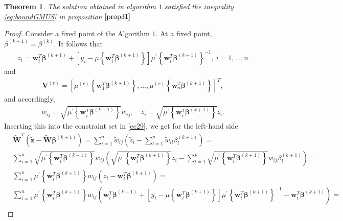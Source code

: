 \documentclass[a4paper,12pt,openany]{report}
\newtheorem{theorem}{\textbf{Theorem}}[section]
\theoremstyle{plain}
\theoremstyle{plain}
\theoremstyle{plain}
\theoremstyle{plain}
\theoremstyle{plain}
\theoremstyle{plain}
\theoremstyle{plain}
\theoremstyle{plain}
\theoremstyle{plain}
\theoremstyle{plain}
\theoremstyle{plain}
\theoremstyle{plain}
\begin{document}
\begin{theorem}
The solution obtained in algorithm $1$ satisfied the inequality \eqref{eq:boundGMUS} in proposition $\ref{prop31}$
\end{theorem}
\begin{proof}
	Consider a fixed point of the Algorithm $1$. At a fixed point, $\beta^{\left(k+1\right)} = \beta^{\left(k\right)}$. It follows that
	\begin{align*}
	z_{i} = \mathbf{w}_{i}^{T}\boldsymbol{\beta}^{(k+1)} + \left[y_{i} - \mu\left\{ \mathbf{w}_{i}^{T}\boldsymbol{\beta}^{(k+1)}\right\}\right]\mu^{\prime}\left\{ \mathbf{w}_{i}^{T}\boldsymbol{\beta}^{(k+1)} \right\}^{-1}, ~i=1,\dots,n
	\end{align*}
	and
	\begin{align*}
	\mathbf{V}^{(r)} = \left[\mu^{(r)}\left\{ \mathbf{w}_{1}^{T}\boldsymbol{\beta}^{(k+1)} \right\} , \dots, \mu^{(r)}\left\{\mathbf{w}_{n}^{T}\boldsymbol{\beta}^{(k+1)} \right\}\right]^{T},
	\end{align*}
	and accordingly,
	\begin{align*}
	\tilde{w}_{ij} = \sqrt{\mu^{\prime}\left\{ \mathbf{w}_{i}^{T}\boldsymbol{\beta}^{(k+1)} \right\} }w_{ij}, \quad \tilde{z}_{i} =\sqrt{\mu^{\prime}\left\{ \mathbf{w}_{i}^{T}\boldsymbol{\beta}^{(k+1)} \right\}}z_{i}.
	\end{align*}
	Inserting this into the constraint set in \eqref{ec29}, we get for the left-hand side
	\begin{align*}
	&\tilde{\mathbf{W}}^{T}\left(\tilde{\mathbf{z}} - \tilde{\mathbf{W}}\boldsymbol{\beta}^{(k+1)}\right)  = 
	\sum_{i=1}^{n} \tilde{w}_{ij} \left(\tilde{z}_{i} - \sum_{l=1}^{p} \tilde{w}_{il}\beta_{l}^{(k+1)}\right) = \\
	&\sum_{i=1}^{n} \sqrt{\mu^{\prime}\left\{ \mathbf{w}_{i}^{T}\boldsymbol{\beta}^{(k+1)} \right\} }w_{ij} \left(\sqrt{\mu^{\prime}\left\{ \mathbf{w}_{i}^{T}\boldsymbol{\beta}^{(k+1)} \right\}}z_{i}  - \sum_{l=1}^{p} \sqrt{\mu^{\prime}\left\{ \mathbf{w}_{i}^{T}\boldsymbol{\beta}^{(k+1)} \right\} }w_{ij} \beta_{l}^{(k+1)} \right) = \\
	&\sum_{i=1}^{n} \mu^{\prime}\left\{ \mathbf{w}_{i}^{T}\boldsymbol{\beta}^{(k+1)} \right\}  w_{ij}\left(z_{i} - \mathbf{w}_{i}^{T}\boldsymbol{\beta}^{(k+1)}\right) = \\
	&\sum_{i=1}^{n} \mu^{\prime}\left\{ \mathbf{w}_{i}^{T}\boldsymbol{\beta}^{(k+1)} \right\}  w_{ij}\left(\mathbf{w}_{i}^{T}\boldsymbol{\beta}^{(k+1)} + \left[y_{i} - \mu\left\{ \mathbf{w}_{i}^{T}\boldsymbol{\beta}^{(k+1)}\right\}\right]\mu^{\prime}\left\{ \mathbf{w}_{i}^{T}\boldsymbol{\beta}^{(k+1)} \right\}^{-1} - \mathbf{w}_{i}^{T}\boldsymbol{\beta}^{(k+1)}\right) = \\

\end{align*}
\end{proof}
\end{document}
